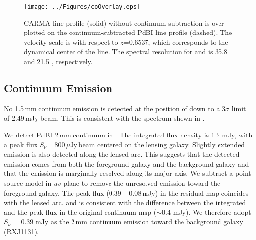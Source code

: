 \documentclass[]{emulateapj}
\begin{document}
\begin{figure}[!htbp]
\texttt{[image: ../Figures/coOverlay.eps]}
\caption{CARMA \cco line profile (solid) without continuum subtraction is
over-plotted on the continuum-subtracted PdBI \bco line profile (dashed).
The velocity scale is with respect to $z$=0.6537, which corresponds to the
dynamical center of the \bco line. The spectral resolution for \cco and \bco
is 35.8 \kms and 21.5 \kms, respectively.
 \label{fig:co32spec}}
\end{figure}



\subsection{Continuum Emission} %
No 1.5\,mm continuum emission is detected at the position of \cco
down to a 3$\sigma$ limit of 2.49\,mJy beam\pmOne.
This is consistent with the spectrum shown in .

We detect PdBI 2\,mm continuum in . The integrated flux density is
1.2 mJy, with a peak flux
$S_\nu$\,=\,800\,$\mu$Jy\,beam\pmOne
centered on the lensing galaxy. Slightly extended emission is also detected
along the lensed arc. This suggests that the detected emission comes from
both the foreground galaxy and the background galaxy and that the
emission is marginally resolved along its major axis.
We subtract a point source model in $uv$-plane to remove the unresolved
emission toward the foreground galaxy. The peak flux (0.39\,$\pm$\,0.08\,mJy)
in the residual map coincides with the lensed arc, and is consistent with
the difference between the integrated and the peak flux in the
original continuum map ($\sim$0.4 mJy). We therefore adopt
$S_\nu$ = 0.39 mJy as the 2\,mm continuum emission toward
the background galaxy (RXJ1131).
\end{document}
